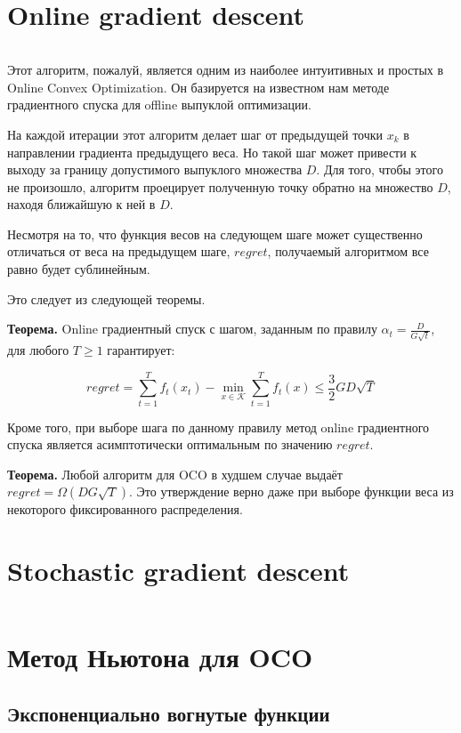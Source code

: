 \documentclass[12pt]{article}
\theoremstyle{definition}
\begin{document}
\section*{Online gradient descent}
$ $

Этот алгоритм, пожалуй, является одним из наиболее интуитивных и простых в Online Convex Optimization. Он базируется на известном нам методе градиентного спуска для offline выпуклой оптимизации.

На каждой итерации этот алгоритм делает шаг от предыдущей точки $x_k$ в направлении градиента предыдущего веса. Но такой шаг может привести к выходу за границу допустимого выпуклого множества $D$. Для того, чтобы этого не произошло, алгоритм проецирует полученную точку обратно на множество $D$, находя ближайшую к ней в $D$.

Несмотря на то, что функция весов на следующем шаге может существенно отличаться от веса на предыдущем шаге, $regret$, получаемый алгоритмом все равно будет сублинейным.

Это следует из следующей теоремы.

\textbf{Теорема.} Online градиентный спуск с шагом, заданным по правилу $\alpha_t = \frac{D}{G\sqrt{t}}$, для любого $T \geq 1$ гарантирует:

$$regret = \sum\limits_{t=1}^T f_t(x_t) - \min\limits_{x\in \mathcal{K}} \sum\limits_{t=1}^T f_t(x) \leq \frac{3}{2}GD\sqrt{T}$$

Кроме того, при выборе шага по данному правилу метод online градиентного спуска является асимптотически оптимальным по значению $regret$.

\textbf{Теорема.} Любой алгоритм для OCO в худшем случае выдаёт $regret = \Omega(DG\sqrt{T})$. Это утверждение верно даже при выборе функции веса из некоторого фиксированного распределения.

\section*{Stochastic gradient descent}
$ $

\section*{Метод Ньютона для OCO}

\subsection*{Экспоненциально вогнутые функции}
\end{document}
